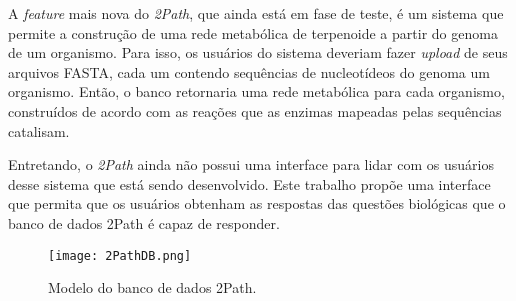\indent A \textit{feature} mais nova do \textit{2Path}, que ainda está em fase de teste, é um sistema que permite a construção de uma rede metabólica de terpenoide a partir do genoma de um organismo. Para isso, os usuários do sistema deveriam fazer \textit{upload} de seus arquivos FASTA, cada um contendo sequências de nucleotídeos do genoma um organismo. Então, o banco retornaria uma rede metabólica para cada organismo, construídos de acordo com as reações que as enzimas mapeadas pelas sequências catalisam.

\indent Entretando, o \textit{2Path} ainda não possui uma interface para lidar com os usuários desse sistema que está sendo desenvolvido. Este trabalho propõe uma interface que permita que os usuários obtenham as respostas das questões biológicas que o banco de dados 2Path é capaz de responder. \\
\newpage
\begin{figure}[!h]
\centering
\texttt{[image: 2PathDB.png]}
\caption{Modelo do banco de dados 2Path.}
\label{2PathDB}
\end{figure}

